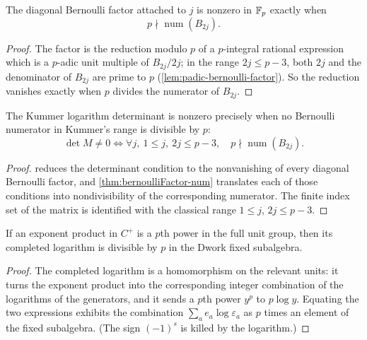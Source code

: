 \begin{theorem}\label{thm:bernoulliFactor-num}
  \leanok
The diagonal Bernoulli factor attached to $j$ is nonzero in $\mathbb{F}_p$ exactly
when
\[
  p\nmid\operatorname{num}(B_{2j}).
\]
\end{theorem}
\begin{proof}\leanok
The factor is the reduction modulo $p$ of a $p$-integral rational
expression which is a $p$-adic unit multiple of $B_{2j}/2j$; in the range
$2j \le p-3$, both $2j$ and the denominator of $B_{2j}$ are prime to $p$
(\cref{lem:padic-bernoulli-factor}).  So the reduction vanishes exactly
when $p$ divides the numerator of $B_{2j}$.
\end{proof}

\begin{theorem}\label{thm:kummer-log-det-bernoulli}
  \leanok
The Kummer logarithm determinant is nonzero precisely when no Bernoulli
numerator in Kummer's range is divisible by $p$:
\[
  \det M\ne0
  \Longleftrightarrow
  \forall j,\ 1\le j,\ 2j\le p-3,\quad
  p\nmid\operatorname{num}(B_{2j}).
\]
\end{theorem}
\begin{proof}\leanok
{} reduces the determinant condition to
the nonvanishing of every diagonal Bernoulli factor, and
\cref{thm:bernoulliFactor-num} translates each of those conditions into
nondivisibility of the corresponding numerator.  The finite index set of
the matrix is identified with the classical range $1\le j$, $2j\le p-3$.
\end{proof}

\begin{theorem}\label{thm:completed-log-relation}
  \leanok
If an exponent product in $C^+$ is a $p$th power in the full unit group,
then its completed logarithm is divisible by $p$ in the Dwork fixed
subalgebra.
\end{theorem}
\begin{proof}\leanok
The completed logarithm is a homomorphism on the relevant units: it turns
the exponent product into the corresponding integer combination of the
logarithms of the generators, and it sends a $p$th power $y^p$ to
$p\log y$.  Equating the two expressions exhibits the combination
$\sum_a e_a \log \varepsilon_a$ as $p$ times an element of the fixed
subalgebra.  (The sign $(-1)^s$ is killed by the logarithm.)
\end{proof}

